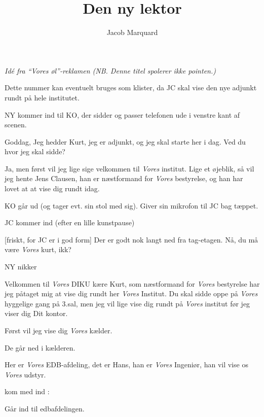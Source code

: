 \documentclass{article}
\title{Den ny lektor}
\author{Jacob Marquard}
\begin{document}
\maketitle

{\centering\sl Idé fra ``{\em Vores} øl''-reklamen (NB. Denne titel
  spolerer ikke pointen.)\par}

\begin{roles}
\end{roles}

\noindent Dette nummer kan eventuelt bruges som klister, da JC skal vise den nye
adjunkt rundt på hele institutet.

\begin{sketch}
  \scene NY kommer ind til KO, der sidder og passer telefonen ude i venstre
  kant af scenen.

 Goddag, Jeg hedder Kurt, jeg er adjunkt, og jeg skal starte her i dag.
Ved  du hvor jeg skal sidde?

 Ja, men først vil jeg lige sige velkommen til {\em Vores}
institut.  Lige et øjeblik, så vil jeg hente Jens Clausen, han er
næstformand for {\em Vores} bestyrelse, og han har lovet at at vise dig
rundt idag.

\scene KO går ud (og tager evt. sin stol med sig). Giver sin mikrofon til
JC bag tæppet.

\scene JC kommer ind (efter en lille kunstpause)

[friskt, for JC er i god form]  Der er godt nok langt ned fra
tag-etagen. Nå, du må være {\em Vores} kurt, ikk?

\scene NY nikker

 Velkommen til {\em Vores} DIKU kære Kurt, som næstformand for
{\em Vores} bestyrelse har jeg påtaget mig at vise dig rundt her {\em
  Vores} Institut.  Du skal sidde oppe på {\em Vores} hyggelige gang på
3.sal, men jeg vil lige vise dig rundt på {\em Vores} institut før jeg
viser dig Dit kontor.

Først vil jeg vise dig {\em Vores} kælder.

\scene
De går ned i kælderen. 

 Her er {\em Vores} EDB-afdeling, det er Hans, han er {\em Vores}
Ingeniør, han vil vise os {\em Vores} udstyr.

 kom med ind :

\scene Går ind til edbafdelingen.


\end{sketch}
\end{document}
